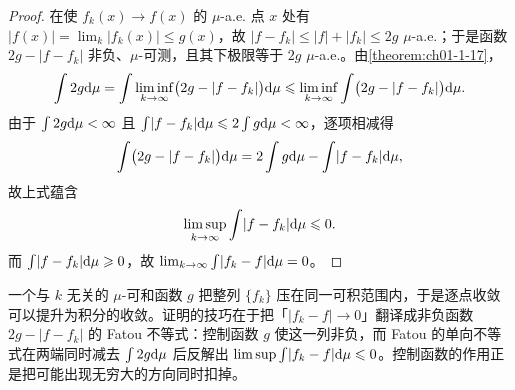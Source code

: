 \documentclass[../../main.tex]{subfiles}%
\begin{document}
\begin{proof}
在使 $f_k(x)\to f(x)$ 的 $\mu$-a.e. 点 $x$ 处有 $\lvert f(x)\rvert=\lim_{k}\lvert f_k(x)\rvert\leqslant g(x)$，故 $\lvert f-f_k\rvert\leqslant\lvert f\rvert+\lvert f_k\rvert\leqslant2g$ $\mu$-a.e.；于是函数 $2g-\lvert f-f_k\rvert$ 非负、$\mu$-可测，且其下极限等于 $2g$ $\mu$-a.e.。由\cref{theorem:ch01-1-17}，%
\begin{align*}
\int 2g\mathrm{d}\mu=\int\liminf_{k\to\infty}\bigl(2g-\lvert f-f_k\rvert\bigr)\mathrm{d}\mu\leqslant\liminf_{k\to\infty}\int\bigl(2g-\lvert f-f_k\rvert\bigr)\mathrm{d}\mu .
\end{align*}
由于 $\int 2g\mathrm{d}\mu<\infty$ 且 $\int\lvert f-f_k\rvert\mathrm{d}\mu\leqslant2\int g\mathrm{d}\mu<\infty$，逐项相减得
\begin{align*}
\int\bigl(2g-\lvert f-f_k\rvert\bigr)\mathrm{d}\mu=2\int g\mathrm{d}\mu-\int\lvert f-f_k\rvert\mathrm{d}\mu,
\end{align*}
故上式蕴含
\begin{align*}
\limsup_{k\to\infty}\int\lvert f-f_k\rvert\mathrm{d}\mu\leqslant0 .
\end{align*}
而 $\int\lvert f-f_k\rvert\mathrm{d}\mu\geqslant0$，故 $\lim_{k\to\infty}\int\lvert f_k-f\rvert\mathrm{d}\mu=0$。
\end{proof}

\begin{remark}\label{remark:ch01-thm-1-19-动机}
一个与 $k$ 无关的 $\mu$-可和函数 $g$ 把整列 $\{f_k\}$ 压在同一可积范围内，于是逐点收敛可以提升为积分的收敛。证明的技巧在于把「$\lvert f_k-f\rvert\to0$」翻译成非负函数 $2g-\lvert f-f_k\rvert$ 的 Fatou 不等式：控制函数 $g$ 使这一列非负，而 Fatou 的单向不等式在两端同时减去 $\int2g\mathrm{d}\mu$ 后反解出 $\limsup\int\lvert f_k-f\rvert\mathrm{d}\mu\leqslant0$。控制函数的作用正是把可能出现无穷大的方向同时扣掉。
\end{remark}
\end{document}

